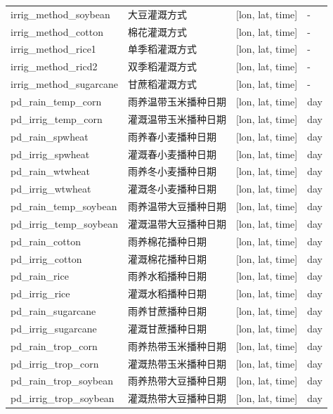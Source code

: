 \documentclass[a4paper,12pt,twoside]{article}
\begin{document}
{\begin{longtable}[htbp]{lp{}ll}
irrig\_method\_soybean & 大豆灌溉方式 & {[}lon, lat, time{]} & - \\
irrig\_method\_cotton & 棉花灌溉方式 & {[}lon, lat, time{]} & - \\
irrig\_method\_rice1 & 单季稻灌溉方式 & {[}lon, lat, time{]} & - \\
irrig\_method\_ricd2 & 双季稻灌溉方式 & {[}lon, lat, time{]} & - \\
irrig\_method\_sugarcane & 甘蔗稻灌溉方式 & {[}lon, lat, time{]} & - \\
pd\_rain\_temp\_corn & 雨养温带玉米播种日期 & {[}lon, lat, time{]} & \unit{day} \\
pd\_irrig\_temp\_corn & 灌溉温带玉米播种日期 & {[}lon, lat, time{]} & \unit{day} \\
pd\_rain\_spwheat & 雨养春小麦播种日期 & {[}lon, lat, time{]} & \unit{day} \\
pd\_irrig\_spwheat & 灌溉春小麦播种日期 & {[}lon, lat, time{]} & \unit{day} \\
pd\_rain\_wtwheat & 雨养冬小麦播种日期 & {[}lon, lat, time{]} & \unit{day} \\
pd\_irrig\_wtwheat & 灌溉冬小麦播种日期 & {[}lon, lat, time{]} & \unit{day} \\
pd\_rain\_temp\_soybean & 雨养温带大豆播种日期 & {[}lon, lat, time{]} & \unit{day} \\
pd\_irrig\_temp\_soybean & 灌溉温带大豆播种日期 & {[}lon, lat, time{]} & \unit{day} \\
pd\_rain\_cotton & 雨养棉花播种日期 & {[}lon, lat, time{]} & \unit{day} \\
pd\_irrig\_cotton & 灌溉棉花播种日期 & {[}lon, lat, time{]} & \unit{day} \\
pd\_rain\_rice & 雨养水稻播种日期 & {[}lon, lat, time{]} & \unit{day} \\
pd\_irrig\_rice & 灌溉水稻播种日期 & {[}lon, lat, time{]} & \unit{day} \\
pd\_rain\_sugarcane & 雨养甘蔗播种日期 & {[}lon, lat, time{]} & \unit{day} \\
pd\_irrig\_sugarcane & 灌溉甘蔗播种日期 & {[}lon, lat, time{]} & \unit{day} \\
pd\_rain\_trop\_corn & 雨养热带玉米播种日期 & {[}lon, lat, time{]} & \unit{day} \\
pd\_irrig\_trop\_corn & 灌溉热带玉米播种日期 & {[}lon, lat, time{]} & \unit{day} \\
pd\_rain\_trop\_soybean & 雨养热带大豆播种日期 & {[}lon, lat, time{]} & \unit{day} \\
pd\_irrig\_trop\_soybean & 灌溉热带大豆播种日期 & {[}lon, lat, time{]} & \unit{day} \\

\end{longtable}}
\end{document}
